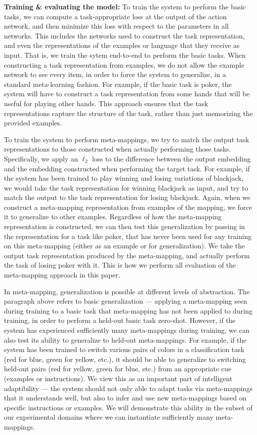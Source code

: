 \textbf{Training \& evaluating the model:} To train the system to perform the basic tasks, we can compute a task-appropriate loss at the output of the action network, and then minimize this loss with respect to the parameters in all networks. This includes the networks used to construct the task representation, and even the representations of the examples or language that they receive as input. That is, we train the sytem end-to-end to perform the basic tasks. When constructing a task representation from examples, we do not allow the example network to see every item, in order to force the system to generalize, in a standard meta-learning fashion. For example, if the basic task is poker, the system will have to construct a task representation from some hands that will be useful for playing other hands. This approach ensures that the task representations capture the structure of the task, rather than just memorizing the provided examples. 

To train the system to perform meta-mappings, we try to match the output task representations to those constructed when actually performing those tasks. Specifically, we apply an \(\ell_2\) loss to the difference between the output embedding and the embedding constructed when performing the target task. For example, if the system has been trained to play winning and losing variations of blackjack, we would take the task representation for winning blackjack as input, and try to match the output to the task representation for losing blackjack. Again, when we construct a meta-mapping representation from examples of the mapping, we force it to generalize to other examples. Regardless of how the meta-mapping representation is constructed, we can then test this generalization by passing in the representation for a task like poker, that has never been used for any training on this meta-mapping (either as an example or for generalization). We take the output task representation produced by the meta-mapping, and actually perform the task of losing poker with it. This is how we perform all evaluation of the meta-mapping approach in this paper.

In meta-mapping, generalization is possible at different levels of abstraction. The paragraph above refers to basic generalization --- applying a meta-mapping seen during training to a basic task that meta-mapping has not been applied to during training, in order to perform a held-out basic task zero-shot. However, if the system has experienced sufficiently many meta-mappings during training, we can also test its ability to generalize to held-out meta-mappings. For example, if the system has been trained to switch various pairs of colors in a classification task (red for blue, green for yellow, etc.), it should be able to generalize to switching held-out pairs (red for yellow, green for blue, etc.) from an appropriate cue (examples or instructions). We view this as an important part of intelligent adaptibility --- the system should not only able to adapt tasks via meta-mappings that it understands well, but also to infer and use new meta-mappings based on specific instructions or examples. We will demonstrate this ability in the subset of our experimental domains where we can instantiate sufficiently many meta-mappings. 

